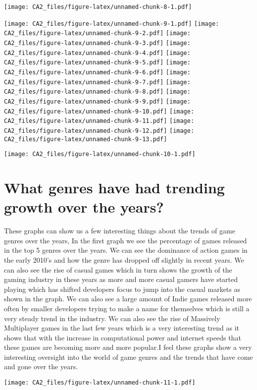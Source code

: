 \documentclass[
]{article}
\begin{document}
\texttt{[image: CA2\_files/figure-latex/unnamed-chunk-8-1.pdf]}

\texttt{[image: CA2\_files/figure-latex/unnamed-chunk-9-1.pdf]}
\texttt{[image: CA2\_files/figure-latex/unnamed-chunk-9-2.pdf]}
\texttt{[image: CA2\_files/figure-latex/unnamed-chunk-9-3.pdf]}
\texttt{[image: CA2\_files/figure-latex/unnamed-chunk-9-4.pdf]}
\texttt{[image: CA2\_files/figure-latex/unnamed-chunk-9-5.pdf]}
\texttt{[image: CA2\_files/figure-latex/unnamed-chunk-9-6.pdf]}
\texttt{[image: CA2\_files/figure-latex/unnamed-chunk-9-7.pdf]}
\texttt{[image: CA2\_files/figure-latex/unnamed-chunk-9-8.pdf]}
\texttt{[image: CA2\_files/figure-latex/unnamed-chunk-9-9.pdf]}
\texttt{[image: CA2\_files/figure-latex/unnamed-chunk-9-10.pdf]}
\texttt{[image: CA2\_files/figure-latex/unnamed-chunk-9-11.pdf]}
\texttt{[image: CA2\_files/figure-latex/unnamed-chunk-9-12.pdf]}
\texttt{[image: CA2\_files/figure-latex/unnamed-chunk-9-13.pdf]}

\texttt{[image: CA2\_files/figure-latex/unnamed-chunk-10-1.pdf]}

\section{What genres have had trending growth over the
years?}\label{what-genres-have-had-trending-growth-over-the-years-1}

These graphs can show us a few interesting things about the trends of
game genres over the years, In the first graph we see the percentage of
games released in the top 5 genres over the years. We can see the
dominance of action games in the early 2010's and how the genre has
dropped off slightly in recent years. We can also see the rise of casual
games which in turn shows the growth of the gaming industry in these
years as more and more casual gamers have started playing which has
shifted developers focus to jump into the casual markets as shown in the
graph. We can also see a large amount of Indie games released more often
by smaller developers trying to make a name for themselves which is
still a very steady trend in the industry. We can also see the rise of
Massively Multiplayer games in the last few years which is a very
interesting trend as it shows that with the increase in computational
power and internet speeds that these games are becoming more and more
popular.I feel these graphs show a very interesting oversight into the
world of game genres and the trends that have come and gone over the
years.

\texttt{[image: CA2\_files/figure-latex/unnamed-chunk-11-1.pdf]}
\end{document}
